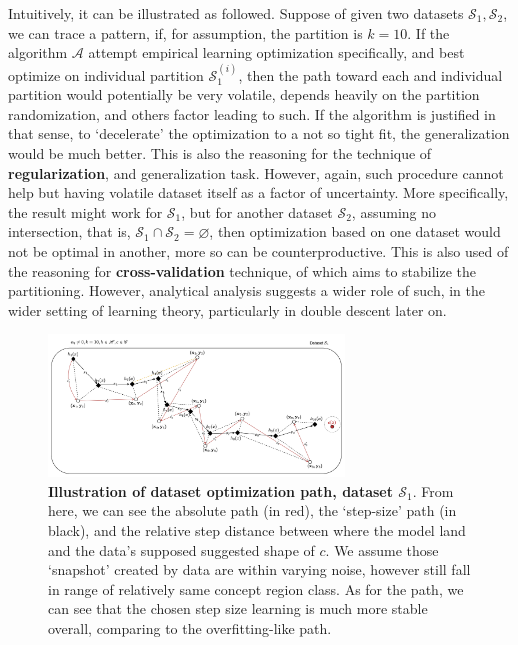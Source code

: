 \documentclass{article}
\begin{document}
Intuitively, it can be illustrated as followed. Suppose of given two datasets $\mathcal{S}_{1},\mathcal{S}_{2}$, we can trace a pattern, if, for assumption, the partition is $k=10$. If the algorithm $\mathcal{A}$ attempt empirical learning optimization specifically, and best optimize on individual partition $\mathcal{S}_{1}^{(i)}$, then the path toward each and individual partition would potentially be very volatile, depends heavily on the partition randomization, and others factor leading to such. If the algorithm is justified in that sense, to `decelerate' the optimization to a not so tight fit, the generalization would be much better. This is also the reasoning for the technique of \textbf{regularization}, and generalization task. However, again, such procedure cannot help but having volatile dataset itself as a factor of uncertainty. More specifically, the result might work for $\mathcal{S}_{1}$, but for another dataset $\mathcal{S}_{2}$, assuming no intersection, that is, $\mathcal{S}_{1}\cap \mathcal{S}_{2}=\varnothing$, then optimization based on one dataset would not be optimal in another, more so can be counterproductive. This is also used of the reasoning for \textbf{cross-validation} technique, of which aims to stabilize the partitioning. However, analytical analysis suggests a wider role of such, in the wider setting of learning theory, particularly in double descent later on. 
\begin{figure}[htb]
  \centering
  \includegraphics[width=0.7\textwidth]{illustration_descent_algorithm1.png}
  \caption{\textbf{Illustration of dataset optimization path, dataset $\mathcal{S}_{1}$}. From here, we can see the absolute path (in red), the `step-size' path (in black), and the relative step distance between where the model land and the data's supposed suggested shape of $c$. We assume those `snapshot' created by data are within varying noise, however still fall in range of relatively same concept region class. As for the path, we can see that the chosen step size learning is much more stable overall, comparing to the overfitting-like path.}
  \label{fig:randomwalk_descent}
\end{figure}
\end{document}
